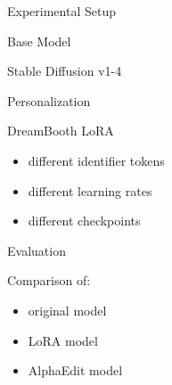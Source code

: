 \documentclass[aspectratio=169]{beamer}
\begin{document}
\begin{frame}{Experimental Setup}


\begin{block}{Base Model}

Stable Diffusion v1-4

\end{block}


\begin{block}{Personalization}

DreamBooth LoRA

\begin{itemize}
    \item different identifier tokens
    \item different learning rates
    \item different checkpoints
\end{itemize}

\end{block}


\begin{block}{Evaluation}

Comparison of:

\begin{itemize}
    \item original model
    \item LoRA model
    \item AlphaEdit model
\end{itemize}

\end{block}


\end{frame}


\end{document}
